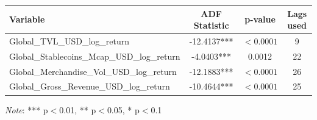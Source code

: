 \begin{tabular}{lccc}
  \toprule
  \textbf{Variable} & \textbf{ADF Statistic} & \textbf{p-value} & \textbf{Lags used} \\ 
  \midrule
  Global\_TVL\_USD\_log\_return & -12.4137*** & $< 0.0001$ & 9 \\ 
  Global\_Stablecoins\_Mcap\_USD\_log\_return & -4.0403*** & 0.0012 & 22 \\ 
  Global\_Merchandise\_Vol\_USD\_log\_return & -12.1883*** & $< 0.0001$ & 26 \\ 
  Global\_Gross\_Revenue\_USD\_log\_return & -10.4644*** & $< 0.0001$ & 25 \\ 
  \bottomrule
\end{tabular}
\par\vspace{4pt}
\begin{minipage}{\linewidth}
  \footnotesize \textit{Note}: *** p$<$0.01, ** p$<$0.05, * p$<$0.1
\end{minipage}